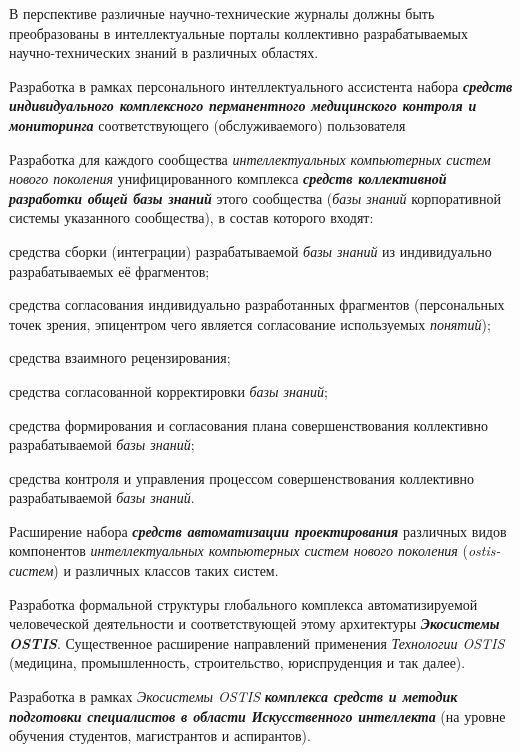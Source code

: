 \begin{textitemize}
\begin{textitemize}
		В перспективе различные научно-технические журналы должны быть преобразованы в интеллектуальные порталы коллективно разрабатываемых научно-технических знаний в различных областях.
	\end{textitemize}
	\item
	Разработка в рамках персонального интеллектуального ассистента набора \textbf{\textit{средств индивидуального комплексного перманентного медицинского контроля и мониторинга}} соответствующего (обслуживаемого) пользователя
	\medskip
	\item Разработка для каждого сообщества \textit{интеллектуальных компьютерных систем нового поколения} унифицированного комплекса \textbf{\textit{средств коллективной разработки общей базы знаний}} этого сообщества (\textit{базы знаний} корпоративной системы указанного сообщества), в состав которого входят:
	\begin{textitemize}
		\item средства сборки (интеграции) разрабатываемой \textit{базы знаний} из индивидуально разрабатываемых её фрагментов;
		\item средства согласования индивидуально разработанных фрагментов (персональных точек зрения, эпицентром чего является согласование используемых \textit{понятий});
		\item средства взаимного рецензирования;
		\item средства согласованной корректировки \textit{базы знаний};
		\item средства формирования и согласования плана совершенствования коллективно разрабатываемой \textit{базы знаний};
		\item средства контроля и управления процессом совершенствования коллективно разрабатываемой \textit{базы знаний}.
	\end{textitemize}
	\item Расширение набора \textbf{\textit{средств автоматизации проектирования}} различных видов компонентов \textit{интеллектуальных компьютерных систем нового поколения} (\textit{ostis-систем}) и различных классов таких систем.
	\medskip
	\item Разработка формальной структуры глобального комплекса автоматизируемой человеческой деятельности и соответствующей этому архитектуры \textbf{\textit{Экосистемы OSTIS}}. Существенное расширение направлений применения \textit{Технологии OSTIS} (медицина, промышленность, строительство, юриспруденция и так далее).
	\medskip
	\item Разработка в рамках \textit{Экосистемы OSTIS} \textbf{\textit{комплекса средств и методик подготовки специалистов в области Искусственного интеллекта}} (на уровне обучения студентов, магистрантов и аспирантов).

\end{textitemize}
